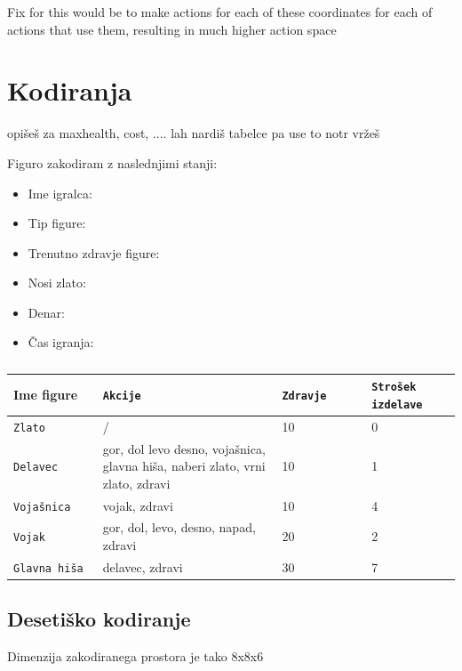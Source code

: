 \documentclass[a4paper, 12pt]{book}
\begin{document}
Fix for this would be to make actions for each of these coordinates for each of actions that use them, resulting in much higher action space






\section{Kodiranja}
opišeš za maxhealth, cost, .... lah nardiš tabelce pa use to notr vržeš



Figuro zakodiram z naslednjimi stanji:
\begin{itemize}
	\item Ime igralca: 
	\item Tip figure:
	\item Trenutno zdravje figure:
	\item Nosi zlato:
	\item Denar:
	\item Čas igranja:
\end{itemize}


\begin{table}
	\begin{center}
		
	\begin{tabular}{p{0.2\linewidth}|p{0.4\linewidth}|p{0.2\linewidth}|p{0.2\linewidth}}
		Ime figure & {\tt Akcije} & {\tt Zdravje} & {\tt Strošek izdelave} \\ \hline
		{\tt Zlato} & / & 10 & 0 \\
		{\tt Delavec}   & gor, dol levo desno, vojašnica, glavna hiša, naberi zlato, vrni zlato, zdravi & 10  & 1 \\
		{\tt Vojašnica}   & vojak, zdravi & 10  & 4 \\
		{\tt Vojak}   & gor, dol, levo, desno, napad, zdravi  & 20 & 2 \\
		{\tt Glavna hiša}   & delavec, zdravi & 30  & 7 \\
	\end{tabular}


	\end{center}
	\caption{}
	\label{tbl:1}
\end{table}


\subsection{Desetiško kodiranje}
Dimenzija zakodiranega prostora je tako 8x8x6
\end{document}
